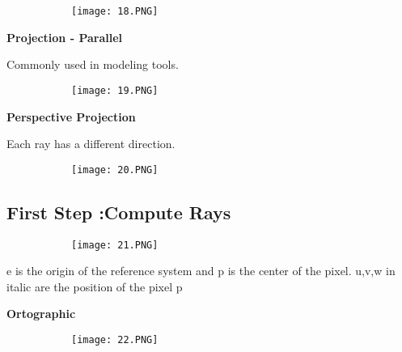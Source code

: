 \documentclass{article}
\begin{document}
\begin{figure}[ht!]
  \centering
  \begin{subfigure}[b]{0.5\linewidth}
    \texttt{[image: 18.PNG]}
  \end{subfigure}
\end{figure}

\vspace{3mm}
\textbf{Projection - Parallel}

Commonly used in modeling tools.

\begin{figure}[ht!]
  \centering
  \begin{subfigure}[b]{0.5\linewidth}
    \texttt{[image: 19.PNG]}
  \end{subfigure}
\end{figure}

\vspace{3mm}
\textbf{Perspective Projection}

Each ray has a different direction.

\begin{figure}[ht!]
  \centering
  \begin{subfigure}[b]{0.5\linewidth}
    \texttt{[image: 20.PNG]}
  \end{subfigure}
\end{figure}

\vspace{10mm}

\subsection{First Step :Compute Rays}

\begin{figure}[ht!]
  \centering
  \begin{subfigure}[b]{0.5\linewidth}
    \texttt{[image: 21.PNG]}
  \end{subfigure}
\end{figure}

e is the origin of the reference system and p is the center of the pixel. u,v,w in italic are the position of the pixel p

\vspace{3mm}
\textbf{Ortographic}


\begin{figure}[ht!]
  \centering
  \begin{subfigure}[b]{0.5\linewidth}
    \texttt{[image: 22.PNG]}
  \end{subfigure}
\end{figure}
\end{document}
